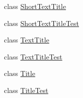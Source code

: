 \begin{DoxyCompactItemize}
class \mbox{\hyperlink{classorg_1_1jfree_1_1chart_1_1title_1_1_short_text_title}{Short\+Text\+Title}}
\item 
class \mbox{\hyperlink{classorg_1_1jfree_1_1chart_1_1title_1_1_short_text_title_test}{Short\+Text\+Title\+Test}}
\item 
class \mbox{\hyperlink{classorg_1_1jfree_1_1chart_1_1title_1_1_text_title}{Text\+Title}}
\item 
class \mbox{\hyperlink{classorg_1_1jfree_1_1chart_1_1title_1_1_text_title_test}{Text\+Title\+Test}}
\item 
class \mbox{\hyperlink{classorg_1_1jfree_1_1chart_1_1title_1_1_title}{Title}}
\item 
class \mbox{\hyperlink{classorg_1_1jfree_1_1chart_1_1title_1_1_title_test}{Title\+Test}}
\end{DoxyCompactItemize}
